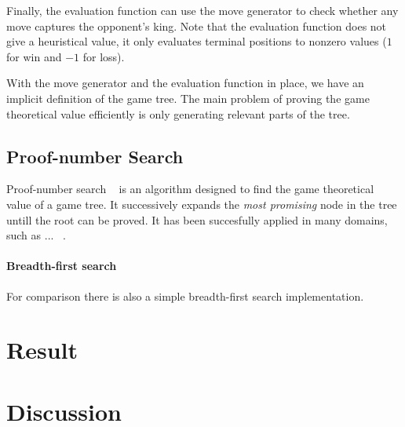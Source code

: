\documentclass{article}
\begin{document}
Finally, the evaluation function can use the move generator to check whether any move captures the opponent's king. Note that the evaluation function
does not give a heuristical value, it only evaluates terminal positions to nonzero values ($1$ for win and $-1$ for loss).

With the move generator and the evaluation function in place, we have an implicit definition of the game tree. The main problem of proving the game
theoretical value efficiently is only generating relevant parts of the tree.

\subsection{Proof-number Search}
Proof-number search ~\cite{allis1994proof} is an algorithm designed to find the game theoretical value of a game tree. It successively expands the
\textit{most promising} node in the tree untill the root can be proved. It has been succesfully applied in many domains, such as ... ~\cite{seo2001pn}.


\paragraph{Breadth-first search}
For comparison there is also a simple breadth-first search implementation.

\section{Result}


\section{Discussion}
\end{document}
